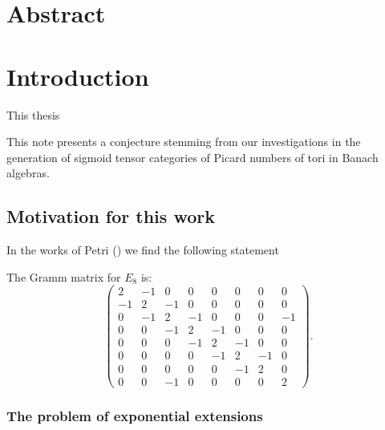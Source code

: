 










\newpage






\chapter*{Abstract}
\lipsum[100]%

\tableofcontents

\chapter{Introduction}
This thesis 

This note presents a conjecture stemming from our investigations in the generation of sigmoid tensor categories of Picard numbers of tori in Banach algebras.
\lipsum[20]
 
\section{Motivation for this work}
In the works of Petri (\cite[Theorem 2.3]{Petri}) we find the following statement

\begin{theorem}
The Gramm matrix for $E_8$ is:
$$
\begin{pmatrix}
2	&-1&0	&0	&0	&0	&0	&0\\
-1	&2	&-1	&0	&0	&0	&0	&0\\
0	&-1	&2	&-1	&0	&0	&0	&-1\\
0	&0	&-1	&2	&-1	&0	&0	&0\\
0	&0	&0	&-1	&2	&-1	&0	&0\\
0	&0	&0	&0	&-1	&2	&-1	&0\\
0	&0	&0	&0	&0	&-1	&2	&0\\
0	&0	&-1	&0	&0	&0	&0	&2
\end{pmatrix}.
$$
\end{theorem}

\subsection{The problem of exponential extensions}
\lipsum[23]

